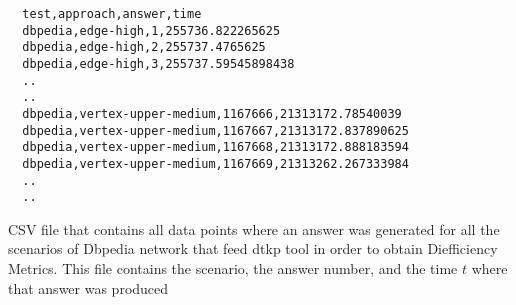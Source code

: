 \begin{listing}[H]
  \begin{verbatim}
  test,approach,answer,time
  dbpedia,edge-high,1,255736.822265625
  dbpedia,edge-high,2,255737.4765625
  dbpedia,edge-high,3,255737.59545898438
  ..
  ..
  dbpedia,vertex-upper-medium,1167666,21313172.78540039
  dbpedia,vertex-upper-medium,1167667,21313172.837890625
  dbpedia,vertex-upper-medium,1167668,21313172.888183594
  dbpedia,vertex-upper-medium,1167669,21313262.267333984
  ..
  ..
\end{verbatim}  
\caption[{[\texttt{results.csv}] Results CSV Dbpedia}]{CSV file that contains all data points where an answer was generated for all the scenarios of Dbpedia network that feed \acrshort{dtkp} tool in order to obtain Diefficiency Metrics. This file contains the scenario, the answer number, and the time $t$ where that answer was produced}
\label{apx:results:csv}
\end{listing}
